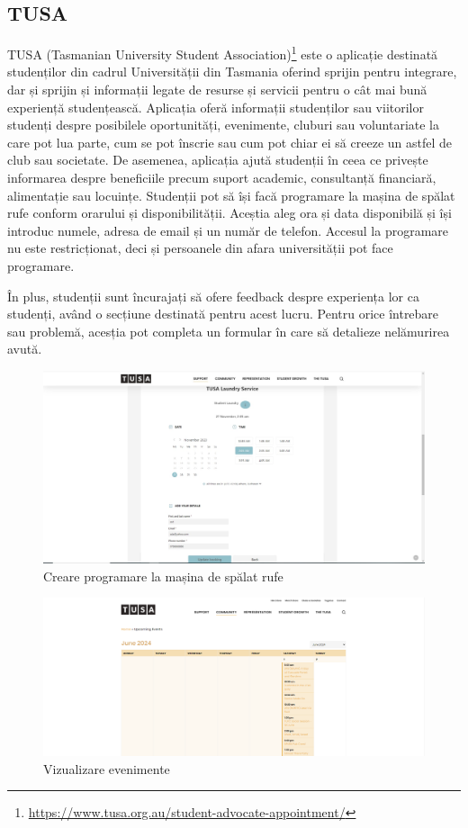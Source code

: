 \documentclass[12pt,a4paper]{report}
\theoremstyle{definition}
\theoremstyle{remark}
\begin{document}
\subsection{TUSA }
\par TUSA (Tasmanian University Student Association)\footnote{\url{https://www.tusa.org.au/student-advocate-appointment/}}  este o aplicație destinată \textnormal{stu\-den\-ți\-lor} din cadrul Universității din Tasmania oferind sprijin pentru integrare, dar și sprijin și informații legate de resurse și servicii pentru o cât mai bună experiență studențească. Aplicația oferă informații studenților sau viitorilor studenți despre posibilele oportunități, evenimente, cluburi sau voluntariate la care pot lua parte, cum se pot înscrie  sau cum pot chiar ei să creeze un astfel de club sau societate. De asemenea, aplicația ajută studenții în ceea ce privește informarea despre beneficiile precum suport academic, consultanță financiară, alimentație sau locuințe. Studenții pot să își facă programare la mașina de spălat rufe conform orarului și disponibilității. Aceștia aleg ora și data disponibilă și își introduc numele, adresa de email și un număr de telefon. Accesul la programare nu este restricționat, deci și persoanele din afara universității pot face programare.

\par În plus, studenții sunt încurajați să ofere feedback despre experiența lor ca studenți, având o secțiune  destinată pentru acest lucru. Pentru orice întrebare sau problemă, acesția pot completa un formular în care să  detalieze nelămurirea avută.

\begin{figure}[H]
    \centering
    \includegraphics[width=0.7\linewidth]{resurse/aplicatii_similare/tusa.png}
    \caption{Creare programare la mașina de spălat rufe}
\end{figure}
\vspace{15mm}
\begin{figure}[H]
    \centering
    \includegraphics[width=0.8\linewidth]{resurse/aplicatii_similare/Tusa_Events.png}
    \caption{Vizualizare evenimente}
\end{figure}
\end{document}
